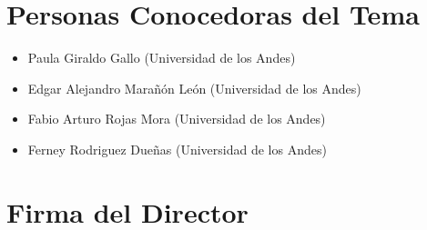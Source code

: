 \documentclass[12pt]{article}
\begin{document}
\section{Personas Conocedoras del Tema}


\begin{itemize}
	\item Paula Giraldo Gallo (Universidad de los Andes)
	\item Edgar Alejandro Marañón León (Universidad de los Andes)
	\item Fabio Arturo Rojas Mora (Universidad de los Andes)
	\item Ferney Rodriguez Dueñas (Universidad de los Andes)
\end{itemize}





\section*{Firma del Director}
\vspace{1.5cm}
\end{document}
